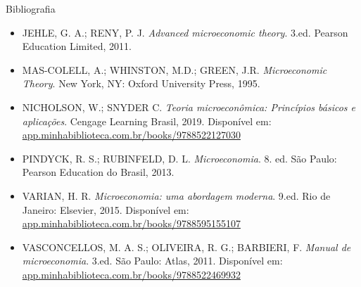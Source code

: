 \documentclass[10pt]{beamer}
\begin{document}
\begin{frame}{Bibliografia }
    \begin{itemize}
        \item JEHLE, G. A.; RENY, P. J. \emph{Advanced microeconomic theory}. 3.ed. Pearson Education Limited, 2011.\medskip
        \item MAS-COLELL, A.; WHINSTON, M.D.; GREEN, J.R. \emph{Microeconomic Theory}. New York, NY: Oxford University Press, 1995.\medskip
        \item NICHOLSON, W.; SNYDER C. \emph{Teoria microeconômica: Princípios básicos e aplicações}. Cengage Learning Brasil, 2019. Disponível em: \href{https://app.minhabiblioteca.com.br/books/9788522127030/}{app.minhabiblioteca.com.br/books/9788522127030}\medskip
        \item PINDYCK, R. S.; RUBINFELD, D. L. \emph{Microeconomia}. 8. ed. São Paulo: Pearson Education do Brasil, 2013.\medskip
        \item VARIAN, H. R. \emph{Microeconomia: uma abordagem moderna}. 9.ed. Rio de Janeiro: Elsevier, 2015. Disponível em: \href{https://app.minhabiblioteca.com.br/books/9788595155107}{app.minhabiblioteca.com.br/books/9788595155107}\medskip
        \item VASCONCELLOS, M. A. S.; OLIVEIRA, R. G.; BARBIERI, F. \emph{Manual de microeconomia}. 3.ed. São Paulo: Atlas, 2011. Disponível em: \href{https://app.minhabiblioteca.com.br/books/9788522469932/}{app.minhabiblioteca.com.br/books/9788522469932}
    \end{itemize}
\end{frame}
\end{document}
